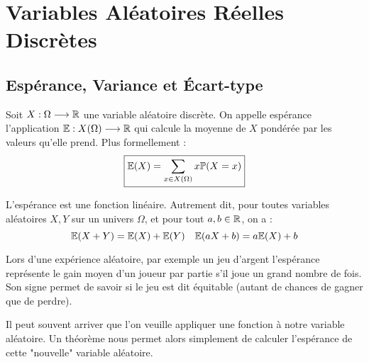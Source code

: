 \chapter{Variables Aléatoires Réelles Discrètes}

\justify

\setlength{\parindent}{0pt}
\renewcommand{\labelitemi}{\textbullet} %





\section{Espérance, Variance et Écart-type}

\begin{definition}[Espérance]
    Soit $X : \Omega \longrightarrow \mathbb{R}$ une variable aléatoire discrète. 
    On appelle espérance l'application $ \mathbb{E} : X(\Omega) \longrightarrow \mathbb{R} $ qui calcule la moyenne de $X$ pondérée par les valeurs qu'elle prend. 
    Plus formellement :
        \[ \boxed { \mathbb{E}(X) = \sum_{x \in X(\Omega)} x \mathbb{P}(X = x) }\] 
\end{definition}

\begin{prop}[Espérance]
    L'espérance est une fonction linéaire. Autrement dit, pour toutes variables aléatoires $X,Y$ sur  un univers $\Omega$, 
    et pour tout $a,b \in \mathbb{R}$, on a :
        \[ \mathbb{E}(X+Y) = \mathbb{E}(X) + \mathbb{E}(Y) \quad \mathbb{E}(aX + b) = a\mathbb{E}(X) + b \]
\end{prop}

Lors d'une expérience aléatoire, par exemple un jeu d'argent l'espérance représente le gain moyen d'un joueur par partie 
s'il joue un grand nombre de fois. Son signe permet de savoir si le jeu est dit équitable (autant de chances de gagner que 
de perdre). 

\vspace{0.3cm}

Il peut souvent arriver que l'on veuille appliquer une fonction à notre variable aléatoire. 
Un théorème nous permet alors simplement de calculer l'espérance de cette "nouvelle" variable aléatoire. 

